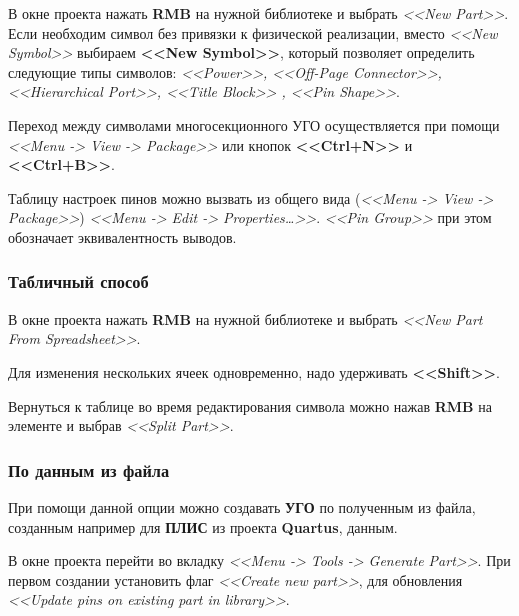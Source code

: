 В окне проекта нажать \textbf{RMB} на нужной библиотеке и выбрать \textit{<<New Part>>}. Если необходим символ без привязки к физической реализации, вместо \textit{<<New Symbol>>} выбираем \textbf{<<New Symbol>>}, который позволяет определить следующие типы символов: \textit{<<Power>>, <<Off-Page Connector>>, <<Hierarchical Port>>, <<Title Block>> , <<Pin Shape>>}.

Переход между символами многосекционного УГО осуществляется при помощи \textit{<<Menu -> View -> Package>>} или кнопок \textbf{<<Ctrl+N>>} и \textbf{<<Ctrl+B>>}.

Таблицу настроек пинов можно вызвать из общего вида (\textit{<<Menu -> View -> Package>>}) \textit{<<Menu -> Edit -> Properties\ldots>>}. \textit{<<Pin Group>>} при этом обозначает эквивалентность выводов.
	\begin{figure}[H]
	\end{figure}

\subsubsection{Табличный способ} \label{sssec:create_symbol_table}

В окне проекта нажать \textbf{RMB} на нужной библиотеке и выбрать \textit{<<New Part From Spreadsheet>>}.

Для изменения нескольких ячеек одновременно, надо удерживать \textbf{<<Shift>>}. 

Вернуться к таблице во время редактирования символа можно нажав \textbf{RMB} на элементе и выбрав \textit{<<Split Part>>}.
	\begin{figure}[H]
	\end{figure}



\subsubsection{По данным из файла} \label{sssec:create_symbol_file}

При помощи данной опции можно создавать \textbf{УГО} по полученным из файла, созданным например для \textbf{ПЛИС} из проекта \textbf{Quartus}, данным.

В окне проекта перейти во вкладку \textit{<<Menu -> Tools -> Generate Part>>}. При первом создании установить флаг \textit{<<Create new part>>}, для обновления \textit{<<Update pins on existing part in library>>}.
	\begin{figure}[H]
	\end{figure}

